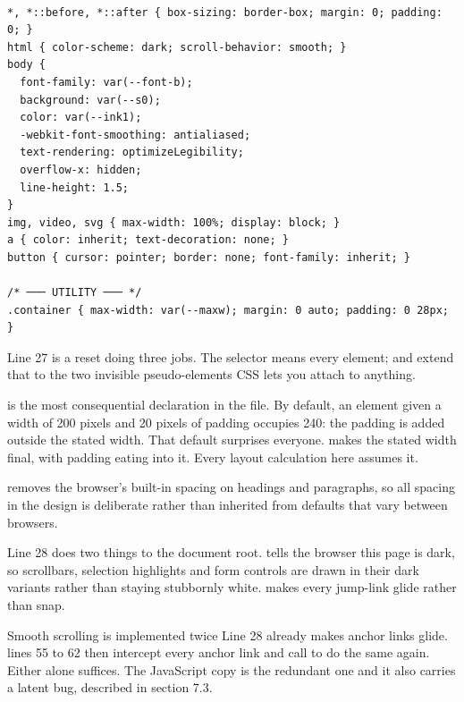 \begin{lstlisting}[firstnumber=26,caption={\file{css/site.css}, lines 26--43}]

*, *::before, *::after { box-sizing: border-box; margin: 0; padding: 0; }
html { color-scheme: dark; scroll-behavior: smooth; }
body {
  font-family: var(--font-b);
  background: var(--s0);
  color: var(--ink1);
  -webkit-font-smoothing: antialiased;
  text-rendering: optimizeLegibility;
  overflow-x: hidden;
  line-height: 1.5;
}
img, video, svg { max-width: 100%; display: block; }
a { color: inherit; text-decoration: none; }
button { cursor: pointer; border: none; font-family: inherit; }

/* ─── UTILITY ─── */
.container { max-width: var(--maxw); margin: 0 auto; padding: 0 28px; }
\end{lstlisting}

Line 27 is a reset doing three jobs. The selector \code{*} means every element;
 and  extend that to the two invisible
pseudo-elements CSS lets you attach to anything.

 is the most consequential declaration in the file. By
default, an element given a width of 200 pixels and 20 pixels of padding occupies
240: the padding is added outside the stated width. That default surprises
everyone.  makes the stated width final, with padding eating into
it. Every layout calculation here assumes it.

 removes the browser's built-in spacing on headings and
paragraphs, so all spacing in the design is deliberate rather than inherited from
defaults that vary between browsers.

Line 28 does two things to the document root.  tells the
browser this page is dark, so scrollbars, selection highlights and form controls
are drawn in their dark variants rather than staying stubbornly white.
 makes every jump-link glide rather than snap.

\begin{honest}{Smooth scrolling is implemented twice}
Line 28 already makes anchor links glide.  lines 55 to 62 then
intercept every anchor link and call 
to do the same again. Either alone suffices. The JavaScript copy is the redundant
one and it also carries a latent bug, described in section 7.3.
\end{honest}

